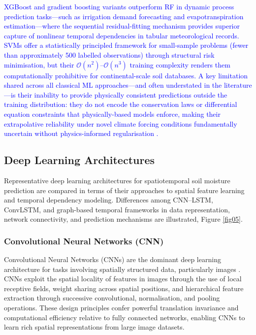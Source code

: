 \documentclass[land,article,submit,pdftex,moreauthors]{Definitions/mdpi}
\numberwithin{equation}{section}
\begin{document}
\textcolor{blue}{XGBoost and gradient boosting variants outperform RF in dynamic process prediction tasks---such as irrigation demand forecasting and evapotranspiration estimation---where the sequential residual-fitting mechanism provides superior capture of nonlinear temporal dependencies in tabular meteorological records. SVMs offer a statistically principled framework for small-sample problems (fewer than approximately 500 labelled observations) through structural risk minimisation, but their $\mathcal{O}(n^2)$--$\mathcal{O}(n^3)$ training complexity renders them computationally prohibitive for continental-scale soil databases. A key limitation shared across all classical ML approaches---and often understated in the literature---is their inability to provide physically consistent predictions outside the training distribution: they do not encode the conservation laws or differential equation constraints that physically-based models enforce, making their extrapolative reliability under novel climate forcing conditions fundamentally uncertain without physics-informed regularisation \citep{willard2022integrating}.}

\subsection{Deep Learning Architectures}
Representative deep learning architectures for spatiotemporal soil moisture prediction are compared in terms of their approaches to spatial feature learning and temporal dependency modeling. Differences among CNN–LSTM, ConvLSTM, and graph-based temporal frameworks in data representation, network connectivity, and prediction mechanisms are illustrated, Figure \ref{fig05}.

\subsubsection{Convolutional Neural Networks (CNN)}

Convolutional Neural Networks (CNNs) are the dominant deep learning architecture for tasks involving spatially structured data, particularly images \citep{lecun1998gradient}. CNNs exploit the spatial locality of features in images through the use of local receptive fields, weight sharing across spatial positions, and hierarchical feature extraction through successive convolutional, normalisation, and pooling operations. These design principles confer powerful translation invariance and computational efficiency relative to fully connected networks, enabling CNNs to learn rich spatial representations from large image datasets.
\end{document}
